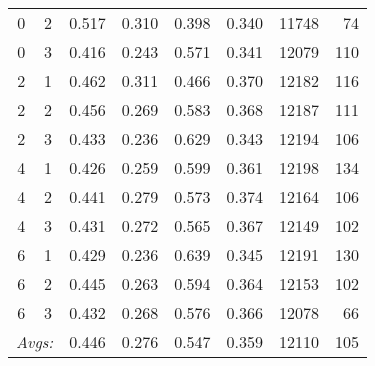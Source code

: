 {\begin{table}
{\begin{tabular}{cc|ccccrr}
0 & 2 & 0.517 & 0.310 & 0.398 & 0.340 & 11748 & 74 \\
0 & 3 & 0.416 & 0.243 & 0.571 & 0.341 & 12079 & 110 \\ \hline %
2 & 1 & 0.462 & 0.311 & 0.466 & 0.370 & 12182 & 116 \\
2 & 2 & 0.456 & 0.269 & 0.583 & 0.368 & 12187 & 111 \\%
2 & 3 & 0.433 & 0.236 & 0.629 & 0.343 & 12194 & 106 \\ \hline %
4 & 1 & 0.426 & 0.259 & 0.599 & 0.361 & 12198 & 134 \\  %
4 & 2 & 0.441 & 0.279 & 0.573 & 0.374 & 12164 & 106 \\
4 & 3 & 0.431 & 0.272 & 0.565 & 0.367 & 12149 & 102 \\ \hline %
6 & 1 & 0.429 & 0.236 & 0.639 & 0.345 & 12191 & 130 \\  %
6 & 2 & 0.445 & 0.263 & 0.594 & 0.364 & 12153 & 102 \\
6 & 3 & 0.432 & 0.268 & 0.576 & 0.366 & 12078 & 66 \\ \hline \hline %
 \multicolumn{2}{r|}{\textit{Avgs:}} & 0.446 & 0.276 & 0.547 & 0.359 & 12110 & 105 \\
\end{tabular}
}
\end{table}}
